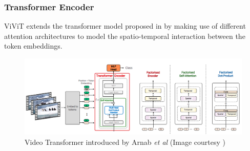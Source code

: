 \subsubsection{Transformer Encoder}

\par ViViT extends the transformer model proposed in \cite{vit} by making use of different attention architectures to model the spatio-temporal interaction between the token embeddings. \par

\begin{figure}[h]
	\includegraphics[width=\linewidth]{assets/img/vivit.png}
	\caption{Video Transformer introduced by Arnab \textit{et al} (Image courtesy \cite{vivit})}
\end{figure}

